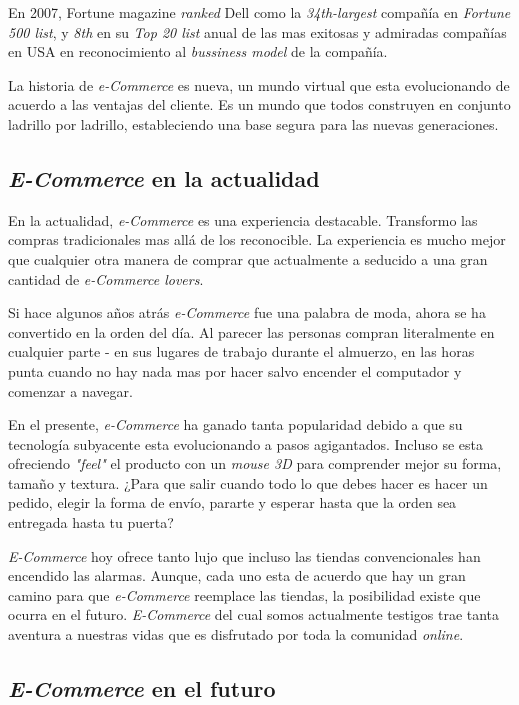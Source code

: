 En 2007, Fortune magazine \textit{ranked} Dell como la \textit{34th-largest} compañía en \textit{Fortune 500 list}, y \textit{8th} en su \textit{Top 20 list} anual de las mas exitosas y admiradas compañías en USA en reconocimiento al \textit{bussiness model} de la compañía.

La historia de \textit{e-Commerce} es nueva, un mundo virtual que esta evolucionando de acuerdo a las ventajas del cliente. Es un mundo que todos construyen en conjunto ladrillo por ladrillo, estableciendo una base segura para las nuevas generaciones.

\subsection{\textit{E-Commerce} en la actualidad}

En la actualidad, \textit{e-Commerce} es una experiencia destacable. Transformo las compras tradicionales mas allá de los reconocible. La experiencia es mucho mejor que cualquier otra manera de comprar que actualmente a seducido a una gran cantidad de \textit{e-Commerce lovers}.

Si hace algunos años atrás \textit{e-Commerce} fue una palabra de moda, ahora se ha convertido en la orden del día. Al parecer las personas compran literalmente en cualquier parte - en sus lugares de trabajo durante el almuerzo, en las horas punta cuando no hay nada mas por hacer salvo encender el computador y comenzar a navegar.

En el presente, \textit{e-Commerce} ha ganado tanta popularidad debido a que su tecnología subyacente esta evolucionando a pasos agigantados. Incluso se esta ofreciendo \textit{"feel"} el producto con un \textit{mouse 3D} para comprender mejor su forma, tamaño y textura. ¿Para que salir cuando todo lo que debes hacer es hacer un pedido, elegir la forma de envío, pararte y esperar hasta que la orden sea entregada hasta tu puerta?

\textit{E-Commerce} hoy ofrece tanto lujo que incluso las tiendas convencionales han encendido las alarmas. Aunque, cada uno esta de acuerdo que hay un gran camino para que \textit{e-Commerce} reemplace las tiendas, la posibilidad existe que ocurra en el futuro. \textit{E-Commerce} del cual somos actualmente testigos trae tanta aventura a nuestras vidas que es disfrutado por toda la comunidad \textit{online}.


\subsection{\textit{E-Commerce} en el futuro}


